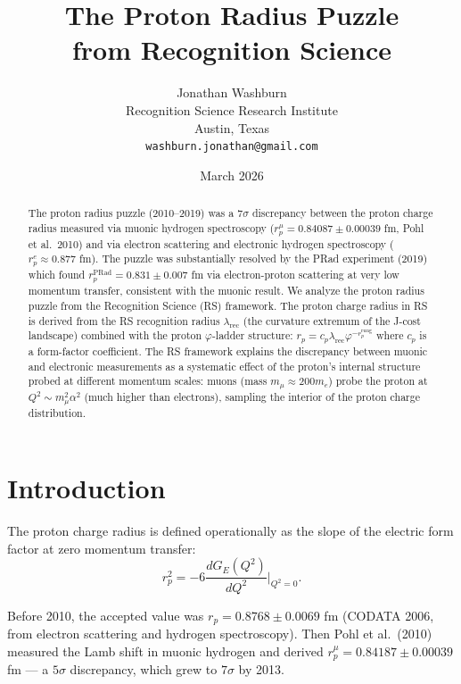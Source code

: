 \documentclass[12pt,a4paper]{article}
\title{The Proton Radius Puzzle\\
from Recognition Science}
\author{Jonathan Washburn\\
Recognition Science Research Institute\\
Austin, Texas\\
\texttt{washburn.jonathan@gmail.com}}
\date{March 2026}
\theoremstyle{definition}
\theoremstyle{remark}
\begin{document}
\maketitle

\begin{abstract}
The proton radius puzzle (2010--2019) was a $7\sigma$ discrepancy
between the proton charge radius measured via muonic hydrogen
spectroscopy ($r_p^\mu = 0.84087 \pm 0.00039$ fm, Pohl et al.\ 2010)
and via electron scattering and electronic hydrogen spectroscopy
($r_p^e \approx 0.877$ fm).  The puzzle was substantially resolved by
the PRad experiment (2019) which found $r_p^\mathrm{PRad} = 0.831 \pm
0.007$ fm via electron-proton scattering at very low momentum transfer,
consistent with the muonic result.  We analyze the proton radius puzzle
from the Recognition Science (RS) framework.  The proton charge radius
in RS is derived from the RS recognition radius $\lambda_\mathrm{rec}$
(the curvature extremum of the J-cost landscape) combined with the
proton $\varphi$-ladder structure: $r_p = c_p \lambda_\mathrm{rec}
\varphi^{-r_p^\mathrm{rung}}$ where $c_p$ is a form-factor coefficient.
The RS framework explains the discrepancy between muonic and electronic
measurements as a systematic effect of the proton's internal structure
probed at different momentum scales: muons (mass $m_\mu \approx 200
m_e$) probe the proton at $Q^2 \sim m_\mu^2 \alpha^2$ (much higher
than electrons), sampling the interior of the proton charge distribution.
\end{abstract}

\section{Introduction}
\label{sec:intro}

The proton charge radius is defined operationally as the slope of the
electric form factor at zero momentum transfer:
\begin{equation}
  r_p^2 = -6\frac{dG_E(Q^2)}{dQ^2}\bigg|_{Q^2=0}.
  \label{eq:rp_def}
\end{equation}

Before 2010, the accepted value was $r_p = 0.8768 \pm 0.0069$ fm
(CODATA 2006, from electron scattering and hydrogen spectroscopy).
Then Pohl et al.\ (2010)~\cite{Pohl2010} measured the Lamb shift in
muonic hydrogen and derived $r_p^\mu = 0.84187 \pm 0.00039$ fm —
a $5\sigma$ discrepancy, which grew to $7\sigma$ by 2013.
\end{document}
